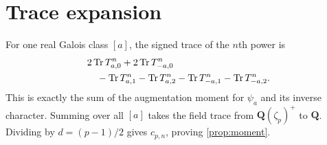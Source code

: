 \appendix
\section{Trace expansion}\label{sec:traceproof}

For one real Galois class $[a]$, the signed trace of the $n$th power is
\begin{align*}
&2\operatorname{Tr} T_{a,0}^n+2\operatorname{Tr} T_{-a,0}^n\\
&\quad-\operatorname{Tr} T_{a,1}^n-\operatorname{Tr} T_{a,2}^n
      -\operatorname{Tr} T_{-a,1}^n-\operatorname{Tr} T_{-a,2}^n.
\end{align*}
This is exactly the sum of the augmentation moment for $\psi_a$ and its
inverse character.  Summing over all $[a]$ takes the field trace from
$\mathbf Q(\zeta_p)^+$ to $\mathbf Q$.  Dividing by
$d=(p-1)/2$ gives $c_{p,n}$, proving \cref{prop:moment}.
